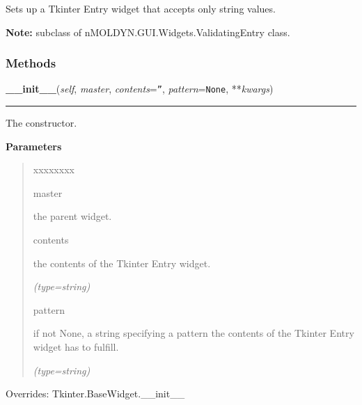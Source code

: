 Sets up a Tkinter Entry widget that accepts only string values.

\textbf{Note:} subclass of nMOLDYN.GUI.Widgets.ValidatingEntry class.





  \subsubsection{Methods}

    \vspace{0.5ex}

\hspace{.8\funcindent}\begin{boxedminipage}{\funcwidth}

    \raggedright \textbf{\_\_init\_\_}(\textit{self}, \textit{master}, \textit{contents}={\tt ''}, \textit{pattern}={\tt None}, **\textit{kwargs})

    \vspace{-1.5ex}

    \rule{\textwidth}{0.5\fboxrule}
\setlength{\parskip}{2ex}
    The constructor.

\setlength{\parskip}{1ex}
      \textbf{Parameters}
      \vspace{-1ex}

      \begin{quote}
        \begin{Ventry}{xxxxxxxx}

          \item[master]

          the parent widget.

          \item[contents]

          the contents of the Tkinter Entry widget.

            {\it (type=string)}

          \item[pattern]

          if not None, a string specifying a pattern the contents of the 
          Tkinter Entry widget has to fulfill.

            {\it (type=string)}

        \end{Ventry}

      \end{quote}

      Overrides: Tkinter.BaseWidget.\_\_init\_\_

    \end{boxedminipage}

